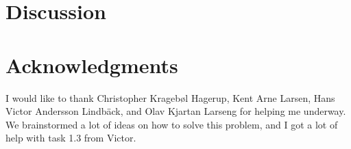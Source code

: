 \documentclass[conference]{IEEEtran}
\begin{document}
\section{Discussion}



\section*{Acknowledgments}
I would like to thank Christopher Kragebøl Hagerup, Kent Arne Larsen, Hans Victor Andersson Lindbäck, and Olav Kjartan Larseng for helping me underway. We brainstormed a lot of ideas on how to solve this problem, and I got a lot of help with task 1.3 from Victor.



\end{document}
